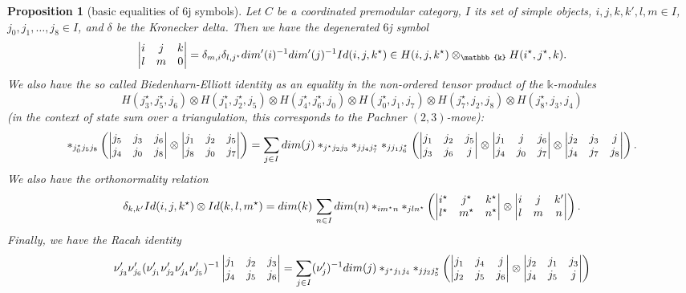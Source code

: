 \documentclass[12pt]{extarticle}
\numberwithin{equation}{section} %
\theoremstyle{mystyle}
\newtheorem{proposition}[equation]{Proposition}
\begin{document}
\begin{proposition}[basic equalities of $6$j symbols]\label{prop/basic-equalities-of-6j-symbols}
  Let $C$ be a coordinated premodular category, $I$ its set of
  simple objects, $i, j, k, k', l, m \in I$,
  $j_{0}, j_{1}, \ldots, j_{8} \in I$, and $\delta$ be the Kronecker
  delta. Then we have the degenerated $6$j symbol
  \begin{equation}\label{eqn/degenerated-6j}
    \normalizedSixJSymbol{i}{j}{k}{l}{m}{0} = \delta_{m,i} \delta_{l,j^{\star}}dim'(i)^{-1}dim'(j)^{-1}Id(i,j,k^{\star})
    \in H(i,j,k^{\star}) \otimes_{\mathbb{k}} H(i^{\star}, j^{\star}, k)
    .
  \end{equation}
  We also have the so called Biedenharn-Elliott identity as an
  equality in the non-ordered tensor product of the
  $\mathbb{k}$-modules
  $$
  H(j_{3}^{\star}, j_{5}^{\star}, j_{6}) \otimes
  H(j_{1}^{\star}, j_{2}^{\star}, j_{5}) \otimes
  H(j_{4}^{\star}, j_{6}^{\star}, j_{0}) \otimes
  H(j_{0}^{\star}, j_{1}, j_{7}) \otimes
  H(j_{7}^{\star}, j_{2}, j_{8}) \otimes
  H(j_{8}^{\star}, j_{3}, j_{4})
  $$
  (in the context of state sum over a triangulation, this
  corresponds to the Pachner $(2,3)$-move):
  \begin{equation}\label{eqn/Biedenharn-Elliot-identity}
    \ast_{j_{0}^{\star}j_{5}j_{8}}
    \left(
      \begin{vmatrix} j_{5} & j_{3} & j_{6} \\ j_{4} & j_{0} & j_{8} \\ \end{vmatrix} \otimes \begin{vmatrix} j_{1} & j_{2} & j_{5} \\ j_{8} & j_{0} & j_{7} \\ \end{vmatrix}
    \right)
    =
    \sum_{j \in I} dim(j)
    \ast_{j^{\star}j_{2}j_{3}}\ast_{jj_{4}j_{7}^{\star}}\ast_{jj_{1}j_{6}^{\star}}
    \left(
      \begin{vmatrix} j_{1} & j_{2} & j_{5} \\ j_{3} & j_{6} & j \\ \end{vmatrix} \otimes
      \begin{vmatrix} j_{1} & j & j_{6} \\ j_{4} & j_{0} & j_{7} \\ \end{vmatrix} \otimes
      \begin{vmatrix} j_{2} & j_{3} & j \\ j_{4} & j_{7} & j_{8} \\ \end{vmatrix}
    \right).
  \end{equation}
  We also have the orthonormality relation
  \begin{equation}\label{eqn/orthonormality-relation}
    \delta_{k,k'} Id(i,j,k^{\star}) \otimes Id(k,l,m^{\star})
    =
    dim(k)\,\sum_{n \in I} dim(n) \ast_{im^{\star}n} \ast_{jln^{\star}}
    \left(
      \begin{vmatrix} i^{\star} & j^{\star} & k^{\star} \\ l^{\star} & m^{\star} & n^{\star} \\ \end{vmatrix} \otimes
      \begin{vmatrix} i & j & k' \\ l & m & n \\ \end{vmatrix}
    \right).
  \end{equation}
  Finally, we have the Racah identity
  \begin{equation}\label{eqn/Racah-identity}
    \nu'_{j_{3}} \nu'_{j_{6}} (\nu'_{j_{1}} \nu'_{j_{2}} \nu'_{j_{4}} \nu'_{j_{5}})^{-1}
    \begin{vmatrix} j_{1} & j_{2} & j_{3} \\ j_{4} & j_{5} & j_{6} \\ \end{vmatrix}
    =
    \sum_{j \in I} (\nu'_{j})^{-1} dim(j) \ast_{j^{\star}j_{1}j_{4}} \ast_{jj_{2}j_{5}^{\star}}
    \left(
      \begin{vmatrix} j_{1} & j_{4} & j \\ j_{2} & j_{5} & j_{6} \\ \end{vmatrix} \otimes
      \begin{vmatrix} j_{2} & j_{1} & j_{3} \\ j_{4} & j_{5} & j \\ \end{vmatrix}
    \right)
  \end{equation}
\end{proposition}
\end{document}
